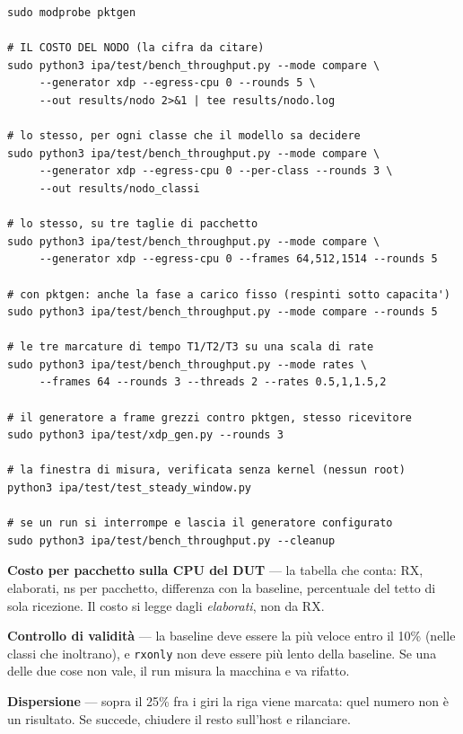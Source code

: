 \documentclass[11pt,a4paper,oneside]{report}
\begin{document}
\begin{lstlisting}
sudo modprobe pktgen

# IL COSTO DEL NODO (la cifra da citare)
sudo python3 ipa/test/bench_throughput.py --mode compare \
     --generator xdp --egress-cpu 0 --rounds 5 \
     --out results/nodo 2>&1 | tee results/nodo.log

# lo stesso, per ogni classe che il modello sa decidere
sudo python3 ipa/test/bench_throughput.py --mode compare \
     --generator xdp --egress-cpu 0 --per-class --rounds 3 \
     --out results/nodo_classi

# lo stesso, su tre taglie di pacchetto
sudo python3 ipa/test/bench_throughput.py --mode compare \
     --generator xdp --egress-cpu 0 --frames 64,512,1514 --rounds 5

# con pktgen: anche la fase a carico fisso (respinti sotto capacita')
sudo python3 ipa/test/bench_throughput.py --mode compare --rounds 5

# le tre marcature di tempo T1/T2/T3 su una scala di rate
sudo python3 ipa/test/bench_throughput.py --mode rates \
     --frames 64 --rounds 3 --threads 2 --rates 0.5,1,1.5,2

# il generatore a frame grezzi contro pktgen, stesso ricevitore
sudo python3 ipa/test/xdp_gen.py --rounds 3

# la finestra di misura, verificata senza kernel (nessun root)
python3 ipa/test/test_steady_window.py

# se un run si interrompe e lascia il generatore configurato
sudo python3 ipa/test/bench_throughput.py --cleanup
\end{lstlisting}

\begin{prima}[Come si legge l'uscita]
\textbf{Costo per pacchetto sulla CPU del DUT} --- la tabella che conta: RX,
elaborati, ns per pacchetto, differenza con la baseline, percentuale del tetto di
sola ricezione. Il costo si legge dagli \emph{elaborati}, non da RX.

\textbf{Controllo di validità} --- la baseline deve essere la più veloce entro il
10\% (nelle classi che inoltrano), e \texttt{rxonly} non deve essere più lento
della baseline. Se una delle due cose non vale, il run misura la macchina e va
rifatto.

\textbf{Dispersione} --- sopra il 25\% fra i giri la riga viene marcata: quel
numero non è un risultato. Se succede, chiudere il resto sull'host e rilanciare.
\end{prima}
\end{document}
